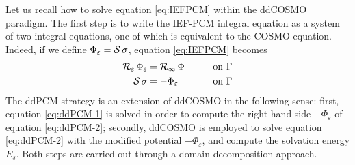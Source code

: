 Let us recall how to solve equation \eqref{eq:IEFPCM} within the ddCOSMO paradigm. The first step is to write the IEF-PCM integral equation as a system of two integral equations, one of which is equivalent to the COSMO equation\cite{Cances_Librone_PCM}. Indeed, if we define $\Phi_\varepsilon = \mathcal{S} \, \sigma$, equation \eqref{eq:IEFPCM} becomes
\begin{alignat}{3}
\mathcal{R}_\varepsilon \, \Phi_\varepsilon & = \mathcal{R}_\infty \, \Phi \qquad && \text{on }\Gamma  \label{eq:ddPCM-1} \\
\mathcal{S} \, \sigma & = -\Phi_\varepsilon  && \text{on }\Gamma \label{eq:ddPCM-2} 
\end{alignat}
The ddPCM strategy is an extension of ddCOSMO in the following sense: first, equation \eqref{eq:ddPCM-1} is solved in order to compute the right-hand side $-\Phi_\varepsilon$ of equation \eqref{eq:ddPCM-2}; secondly, ddCOSMO is employed to solve equation \eqref{eq:ddPCM-2} with the modified potential $-\Phi_\varepsilon$, and compute the solvation energy $E_s$. Both steps are carried out through a domain-decomposition approach.

